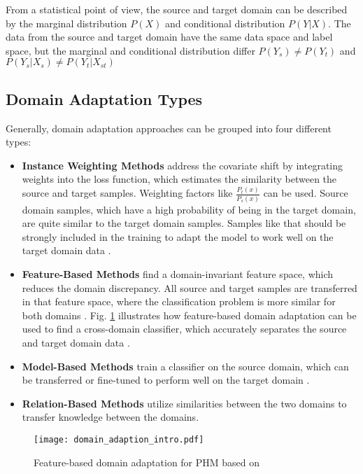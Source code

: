 From a statistical point of view, the source and target domain can be described by the marginal distribution $P(X)$ and conditional distribution $P(Y|X)$. The data from the source and target domain have the same data space and label space, but the marginal and conditional distribution differ $P(Y_{s}) \neq P(Y_{t})$ and $P(Y_{s}|X_{s}) \neq P(Y_{t}|X_{st})$ \cite{Qikang2020}

\subsection{Domain Adaptation Types}
Generally, domain adaptation approaches can be grouped into four different types:  

\begin{itemize}
\item \textbf{Instance Weighting Methods} address the covariate shift by integrating weights into the loss function, which estimates the similarity between the source and target samples. Weighting factors like $\frac{P_{t}(x)}{P_{s}(x)}$ can be used. Source domain samples, which have a high probability of being in the target domain, are quite similar to the target domain samples. Samples like that should be strongly included in the training to adapt the model to work well on the target domain data \cite{AZAMFAR2020103932}.
\item \textbf{Feature-Based Methods} find a domain-invariant feature space, which reduces the domain discrepancy. All source and target samples are transferred in that feature space, where the classification problem is more similar for both domains \cite{AZAMFAR2020103932}. Fig. \ref{fig:Domain_adaption_intro} illustrates how feature-based domain adaptation can be used to find a cross-domain classifier, which accurately separates the source and target domain data \cite{AZAMFAR2020103932}. 
\item \textbf{Model-Based Methods} train a classifier on the source domain, which can be transferred or fine-tuned to perform well on the target domain \cite{AZAMFAR2020103932}.
\item \textbf{Relation-Based Methods} utilize similarities between the two domains to transfer knowledge between the domains\cite{AZAMFAR2020103932}. 
\end{itemize}

\begin{figure}[H]
  \centering
  \texttt{[image: domain\_adaption\_intro.pdf]}
  \caption {Feature-based domain adaptation for PHM based on \cite{Pandhare2021}} \label{fig:Domain_adaption_intro}
\end{figure}


